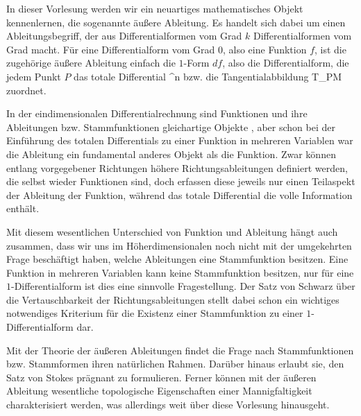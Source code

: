 \setcounter{section}{20}


In dieser Vorlesung werden wir ein neuartiges mathematisches Objekt kennenlernen, die sogenannte äußere Ableitung. Es handelt sich dabei um einen Ableitungsbegriff, der aus Differentialformen vom Grad $k$ Differentialformen vom Grad
 macht. Für eine Differentialform vom Grad $0$, also eine Funktion $f$, ist die zugehörige äußere Ableitung einfach die $1$-Form $df$, also die Differentialform, die jedem Punkt $P$
 {} {}
das totale Differential
 { \R^n } { \R
} {}
bzw.
 {} {}
die Tangentialabbildung
 {T_PM} {\R
} {}
zuordnet.

In der eindimensionalen Differentialrechnung sind Funktionen und ihre Ableitungen bzw. Stammfunktionen gleichartige Objekte
 {} {,}
aber schon bei der Einführung des totalen Differentials zu einer Funktion in mehreren Variablen war die Ableitung ein fundamental anderes Objekt als die Funktion. Zwar können entlang vorgegebener Richtungen höhere Richtungsableitungen definiert werden, die selbst wieder Funktionen sind, doch erfassen diese jeweils nur einen Teilaspekt der Ableitung der Funktion, während das totale Differential die volle Information enthält.

Mit diesem wesentlichen Unterschied von Funktion und Ableitung hängt auch zusammen, dass wir uns im Höherdimensionalen noch nicht mit der umgekehrten Frage beschäftigt haben, welche Ableitungen eine Stammfunktion besitzen. Eine Funktion in mehreren Variablen kann keine Stammfunktion besitzen, nur für eine $1$-Differentialform
 {} {}
ist dies eine sinnvolle Fragestellung. Der Satz von Schwarz über die Vertauschbarkeit der Richtungsableitungen stellt dabei schon ein wichtiges notwendiges Kriterium für die Existenz einer Stammfunktion zu einer $1$-Differentialform dar.

Mit der Theorie der äußeren Ableitungen findet die Frage nach Stammfunktionen bzw. Stammformen ihren natürlichen Rahmen. Darüber hinaus erlaubt sie, den Satz von Stokes prägnant zu formulieren. Ferner können mit der äußeren Ableitung wesentliche topologische Eigenschaften einer Mannigfaltigkeit charakterisiert werden, was allerdings weit über diese Vorlesung hinausgeht.

